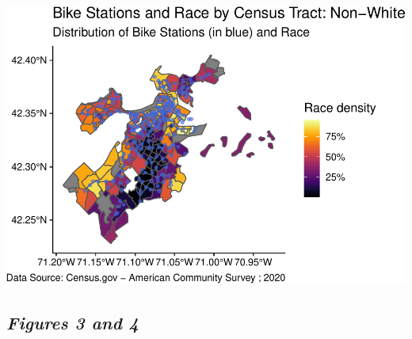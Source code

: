 \documentclass[
  12pt,
]{article}
\begin{document}
\begin{flushleft}\includegraphics{Project_Template_files/figure-latex/develop plots race white-1} \end{flushleft}

\newpage

\hypertarget{figures-3-and-4}{%
\subsection{\texorpdfstring{\emph{Figures 3 and
4}}{Figures 3 and 4}}\label{figures-3-and-4}}
\end{document}
